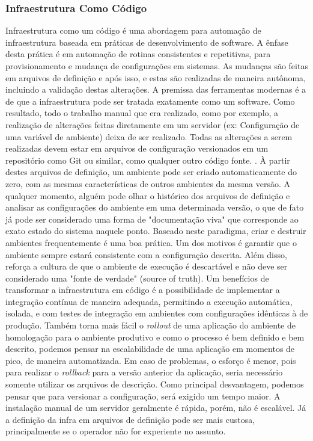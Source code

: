 \documentclass[twoside,english,brazilian]{UNISINOSartigo}
\begin{document}
\subsubsection{Infraestrutura Como Código}
Infraestrutura como um código é uma abordagem para automação de infraestrutura baseada em práticas de desenvolvimento de software. A ênfase desta prática é em automação de rotinas consistentes e repetitivas, para provisionamento e mudança de configurações em sistemas. As mudanças são feitas em arquivos de definição e após isso, e estas são realizadas de maneira autônoma, incluindo a validação destas alterações.
A premissa das ferramentas modernas é a de que a infraestrutura pode ser tratada exatamente como um software.  Como resultado, todo o trabalho manual que era realizado, como por exemplo, a realização de alterações feitas diretamente em um servidor (ex: Configuração de uma variável de ambiente) deixa de ser realizado. Todas as alterações a serem realizadas devem estar em arquivos de configuração versionados em um repositório como Git ou similar, como qualquer outro código fonte. \citep{Morris2016}. \newline
À partir destes arquivos de definição, um ambiente pode ser criado automaticamente do zero, com as mesmas características de outros ambientes da mesma versão. A qualquer momento, alguém pode olhar o histórico dos arquivos de definição e analisar as configurações do ambiente em uma determinada versão, o que de fato já pode ser considerado uma forma de "documentação viva" que corresponde ao exato estado do sistema naquele ponto.	\newline 
Baseado neste paradigma, criar e destruir ambientes frequentemente é uma boa prática. Um dos motivos é garantir que o ambiente sempre estará consistente com a configuração descrita. Além disso, reforça a cultura de que o ambiente de execução é descartável e não deve ser considerado uma "fonte de verdade" (source of truth).
Um benefícios de transformar a infraestrutura em código é a possibilidade de implementar a integração contínua de maneira adequada, permitindo a execução automática, isolada, e com testes de integração em ambientes com configurações idênticas à de produção. Também torna mais fácil o \textit{rollout} de uma aplicação do ambiente de homologação para o ambiente produtivo e como o processo é bem definido e bem descrito, podemos pensar na escalabilidade de uma aplicação em momentos de pico, de maneira automatizada. Em caso de problemas, o esforço é menor, pois para realizar o \textit{rollback} para a versão anterior da aplicação, seria necessário somente utilizar os arquivos de descrição. \newline
Como principal desvantagem, podemos pensar que para versionar a configuração, será exigido um tempo maior. A instalação manual de um servidor geralmente é rápida, porém, não é escalável. Já a definição da infra em arquivos de definição pode ser mais custosa, principalmente se o operador não for experiente no assunto.
\end{document}
